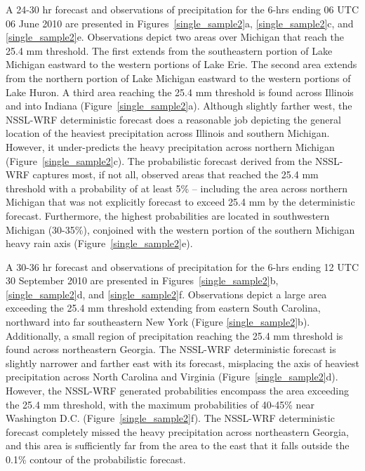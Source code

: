 A 24-30 hr forecast and observations of precipitation for the 6-hrs ending 06 UTC 06 June 2010 are presented in \mbox{Figures \ref{single_sample2}a}, \mbox{\ref{single_sample2}c}, and \mbox{\ref{single_sample2}e}.
Observations depict two areas over Michigan that reach the 25.4 mm threshold.
The first extends from the southeastern portion of Lake Michigan eastward to the western portions of Lake Erie.
The second area extends from the northern portion of Lake Michigan eastward to the western portions of Lake Huron.
A third area reaching the 25.4 mm threshold is found across Illinois and into Indiana \mbox{(Figure \ref{single_sample2}a)}.
Although slightly farther west, the NSSL-WRF deterministic forecast does a reasonable job depicting the general location of the heaviest precipitation across Illinois and southern Michigan.
However, it under-predicts the heavy precipitation across northern Michigan \mbox{(Figure \ref{single_sample2}c)}.
The probabilistic forecast derived from the NSSL-WRF captures most, if not all, observed areas that reached the 25.4 mm threshold with a probability of at least 5\% -- including the area across northern Michigan that was not explicitly forecast to exceed 25.4 mm by the deterministic forecast.
Furthermore, the highest probabilities are located in southwestern Michigan (30-35\%), conjoined with the western portion of the southern Michigan heavy rain axis \mbox{(Figure \ref{single_sample2}e)}.


A 30-36 hr forecast and observations of precipitation for the 6-hrs ending 12 UTC 30 September 2010 are presented in \mbox{Figures \ref{single_sample2}b}, \mbox{\ref{single_sample2}d}, and \mbox{\ref{single_sample2}f}.
Observations depict a large area exceeding the 25.4 mm threshold extending from eastern South Carolina, northward into far southeastern New York (Figure \mbox{\ref{single_sample2}b)}.
Additionally, a small region of precipitation reaching the 25.4 mm threshold is found across northeastern Georgia.
The NSSL-WRF deterministic forecast is slightly narrower and farther east with its forecast, misplacing the axis of heaviest precipitation across North Carolina and Virginia \mbox{(Figure \ref{single_sample2}d)}.
However, the NSSL-WRF generated probabilities encompass the area exceeding the 25.4 mm threshold, with the maximum probabilities of 40-45\% near Washington D.C. \mbox{(Figure \ref{single_sample2}f)}.
The NSSL-WRF deterministic forecast completely missed the heavy precipitation across northeastern Georgia, and this area is sufficiently far from the area to the east that it falls outside the 0.1\% contour of the probabilistic forecast.


